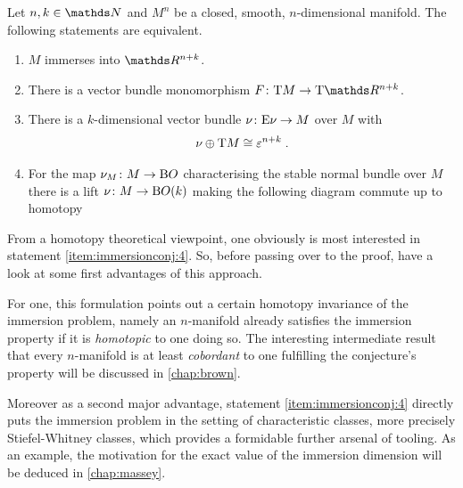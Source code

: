 \begin{Thm}\label{thm:immersionconj:equivalences}
  Let $n,k\in\Nat$ and $M^n$ be a closed, smooth, $n$-dimensional manifold.
  The following statements are equivalent.
  \begin{enumerate}
  \item\label{item:immersionconj:1}
    $M$ immerses into $\R^{n+k}$.
  \item\label{item:immersionconj:2}
    There is a vector bundle monomorphism $F\colon\T M\to\T{\R^{n+k}}$.
  \item\label{item:immersionconj:3}
    There is a $k$-dimensional vector bundle
    $\nu_{}\colon\mathrm{E}\nu_{}\to M$ over $M$ with
    \begin{gather*}
      \nu_{}\oplus\mathrm{T}M\cong\varepsilon^{n+k}
      \;.
    \end{gather*}
  \item\label{item:immersionconj:4}
    For the map $\nu_{M}\colon M\to\mathrm{B}O$ characterising the stable
    normal bundle over $M$ there is a lift $\nu_{}\colon M\to\mathrm{B}O(k)$
    making the following diagram commute up to homotopy
    \begin{center}
    \end{center}
  \end{enumerate}
\end{Thm}
From a homotopy theoretical viewpoint, one obviously is most
interested in statement \ref{item:immersionconj:4}.
So, before passing over to the proof, have a look at some first
advantages of this approach.

For one, this formulation points out a certain homotopy invariance of
the immersion problem, namely an $n$-manifold already satisfies the
immersion property if it is \emph{homotopic} to one doing so. 
The interesting intermediate result that every $n$-manifold is
at least \emph{cobordant} to one fulfilling the conjecture's property
will be discussed in \autoref{chap:brown}.

Moreover as a second major advantage, statement
\ref{item:immersionconj:4} directly puts the immersion problem in the
setting of characteristic classes, more precisely Stiefel-Whitney
classes, which provides a formidable further arsenal of tooling.
As an example, the motivation for the exact value of the immersion
dimension will be deduced in \autoref{chap:massey}.

